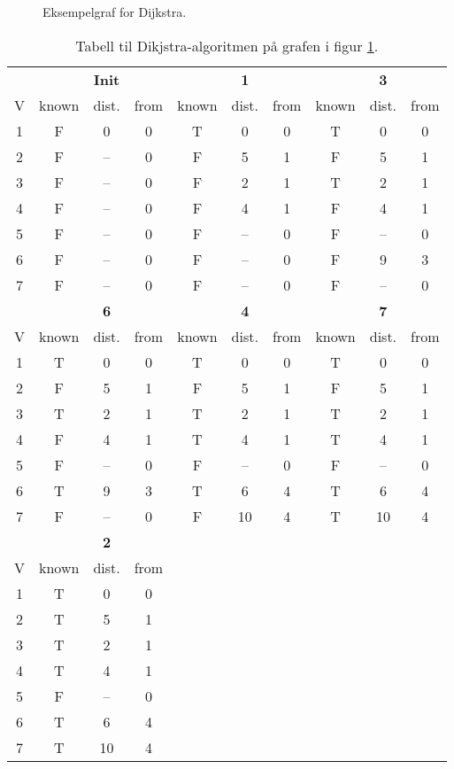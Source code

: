 \documentclass[11pt,a4paper]{article}
\theoremstyle{def}
\begin{document}
\begin{figure}[h!]
\centering
{}
\caption{Eksempelgraf for Dijkstra.}
\label{fig:graph2}
\end{figure}

\begin{table}
\centering
\begin{tabular}{c|ccc|ccc|ccc}
&&\textbf{Init}&&&\textbf{1}&&&\textbf{3}\\
V & known & dist. & from&known&dist.&from&known&dist.&from\\
\hline
1 & F & 0 & 0&T&0&0&T&0&0\\
2 & F & -- & 0&F&5&1&F&5&1\\
3 & F & -- & 0&F&2&1&T&2&1\\
4 & F & -- & 0&F&4&1&F&4&1\\
5 & F & -- & 0&F&--&0&F&--&0\\
6 & F & -- & 0&F&--&0&F&9&3\\
7 & F & -- & 0&F&--&0&F&--&0\\
\hline
\hline
&&\textbf{6}&&&\textbf{4}&&&\textbf{7}\\
V & known & dist. & from&known&dist.&from&known&dist.&from\\
\hline
1&T&0&0&T&0&0&T&0&0\\
2&F&5&1&F&5&1&F&5&1\\
3&T&2&1&T&2&1&T&2&1\\
4&F&4&1&T&4&1&T&4&1\\
5&F&--&0&F&--&0&F&--&0\\
6&T&9&3&T&6&4&T&6&4\\
7&F&--&0&F&10&4&T&10&4\\
\hline
\hline
&&\textbf{2}&\\
V & known & dist. & from\\
\cline{1-4}
1&T&0&0\\
2&T&5&1\\
3&T&2&1\\
4&T&4&1\\
5&F&--&0\\
6&T&6&4\\
7&T&10&4\\
\end{tabular}
\label{tab:dijkstra}
\caption{Tabell til Dikjstra-algoritmen på grafen i figur \ref{fig:graph2}.}
\end{table}
\end{document}
